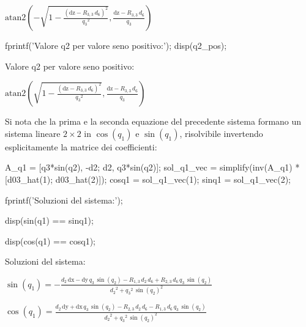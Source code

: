 \documentclass[11pt, a4paper]{article}
\begin{document}
\begin{matlabsymbolicoutput}
$\displaystyle \textrm{atan2}\left(-\sqrt{1-\frac{{{\left(\textrm{dz}-R_{3,3} \,d_6 \right)}}^2 }{{q_3 }^2 }},\frac{\textrm{dz}-R_{3,3} \,d_6 }{q_3 }\right)$
\end{matlabsymbolicoutput}
\begin{matlabcode}
fprintf('Valore q2 per valore seno positivo:');
disp(q2_pos);
\end{matlabcode}
\begin{matlaboutput}
Valore q2 per valore seno positivo:
\end{matlaboutput}

\begin{matlabsymbolicoutput}
$\displaystyle \textrm{atan2}\left(\sqrt{1-\frac{{{\left(\textrm{dz}-R_{3,3} \,d_6 \right)}}^2 }{{q_3 }^2 }},\frac{\textrm{dz}-R_{3,3} \,d_6 }{q_3 }\right)$
\end{matlabsymbolicoutput}

\newpage
{}

\begin{par}
\begin{flushleft}
Si nota che la prima e la seconda equazione del precedente sistema formano un sistema lineare $2\times 2$ in $\cos (q_1 )$ e $\sin (q_1 )$, risolvibile invertendo esplicitamente la matrice dei coefficienti:
\end{flushleft}
\end{par}

\begin{matlabcode}
A_q1 = [q3*sin(q2), -d2;
        d2,          q3*sin(q2)];
sol_q1_vec = simplify(inv(A_q1) * [d03_hat(1); d03_hat(2)]);
cosq1 = sol_q1_vec(1);
sinq1 = sol_q1_vec(2);

fprintf('Soluzioni del sistema:');

disp(sin(q1) == sinq1);

disp(cos(q1) == cosq1);
\end{matlabcode}
\begin{matlaboutput}
Soluzioni del sistema:
\end{matlaboutput}
\begin{matlabsymbolicoutput}
$\displaystyle \sin \left(q_1 \right)=-\frac{d_2 \,\textrm{dx}-\textrm{dy}\,q_3 \,\sin \left(q_2 \right)-R_{1,3} \,d_2 \,d_6 +R_{2,3} \,d_6 \,q_3 \,\sin \left(q_2 \right)}{{d_2 }^2 +{q_3 }^2 \,{\sin \left(q_2 \right)}^2 }$
\end{matlabsymbolicoutput}
\begin{matlabsymbolicoutput}
$\displaystyle \cos \left(q_1 \right)=\frac{d_2 \,\textrm{dy}+\textrm{dx}\,q_3 \,\sin \left(q_2 \right)-R_{2,3} \,d_2 \,d_6 -R_{1,3} \,d_6 \,q_3 \,\sin \left(q_2 \right)}{{d_2 }^2 +{q_3 }^2 \,{\sin \left(q_2 \right)}^2 }$
\end{matlabsymbolicoutput}
\end{document}
